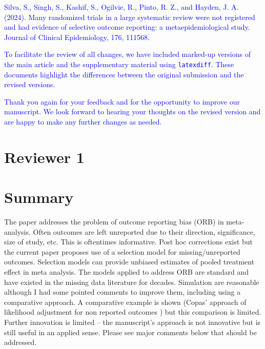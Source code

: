 \documentclass{article}
\begin{document}
\bigskip

\textcolor{blue}{Silva, S., Singh, S., Kashif, S., Ogilvie, R., Pinto, R. Z., and Hayden, J. A. (2024). Many randomized trials in a large systematic review were not registered and had evidence of selective outcome reporting: a metaepidemiological study. Journal of Clinical Epidemiology, 176, 111568.}

\bigskip

\textcolor{blue}{
  To facilitate the review of all changes, we have included marked-up versions of the main article and the supplementary material using \texttt{latexdiff}. These documents highlight the differences between the original submission %
  and the revised versions.} %

\bigskip
\textcolor{blue}{
Thank you again for your feedback and for the opportunity to improve our manuscript. We look forward to hearing your thoughts on the revised version and are happy to make any further changes as needed.}



\section*{Reviewer 1}

\section*{Summary}

The paper addresses the problem of outcome reporting bias (ORB) in meta-analysis. Often outcomes are left unreported due to their direction, significance, size of study, etc. This is oftentimes informative. Post hoc corrections exist but the current paper proposes use of a selection model for missing/unreported outcomes. Selection models can provide unbiased estimates of pooled treatment effect in meta analysis. The models applied to address ORB are standard and have existed in the missing data literature for decades. Simulation are reasonable although I had some pointed comments to improve them, including using a comparative approach. A comparative example is shown (Copas’ approach of likelihood adjustment for non reported outcomes ) but this comparison is limited. Further innovation is limited – the manuscript’s approach is not innovative but is still useful in an applied sense. Please see major comments below that should be addressed. 
\end{document}
